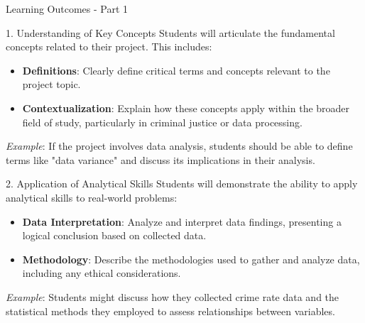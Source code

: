 \documentclass[aspectratio=169]{beamer}
\begin{document}
\begin{frame}[fragile]{Learning Outcomes - Part 1}
    \begin{block}{1. Understanding of Key Concepts}
        Students will articulate the fundamental concepts related to their project. This includes:
        \begin{itemize}
            \item \textbf{Definitions}: Clearly define critical terms and concepts relevant to the project topic.
            \item \textbf{Contextualization}: Explain how these concepts apply within the broader field of study, particularly in criminal justice or data processing.
        \end{itemize}
        \textit{Example}: If the project involves data analysis, students should be able to define terms like "data variance" and discuss its implications in their analysis.
    \end{block}

    \begin{block}{2. Application of Analytical Skills}
        Students will demonstrate the ability to apply analytical skills to real-world problems:
        \begin{itemize}
            \item \textbf{Data Interpretation}: Analyze and interpret data findings, presenting a logical conclusion based on collected data.
            \item \textbf{Methodology}: Describe the methodologies used to gather and analyze data, including any ethical considerations.
        \end{itemize}
        \textit{Example}: Students might discuss how they collected crime rate data and the statistical methods they employed to assess relationships between variables.
    \end{block}
\end{frame}
\end{document}
